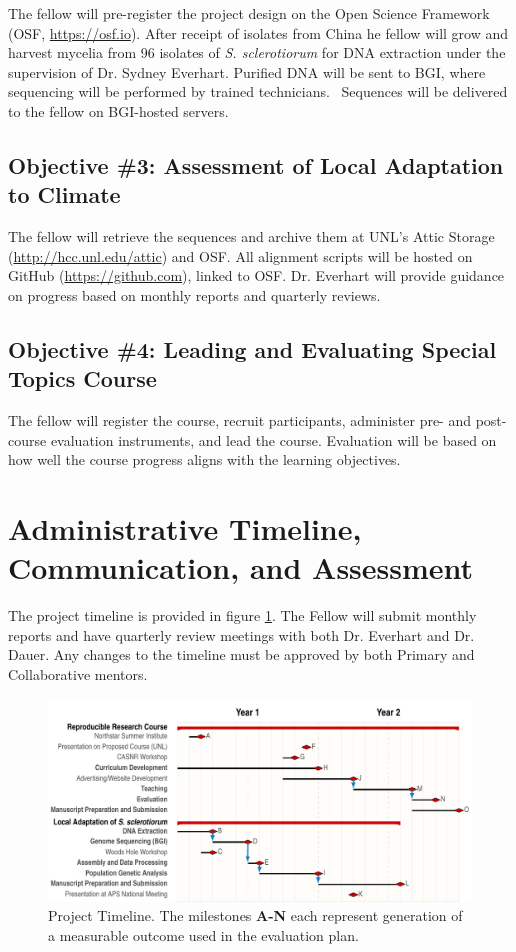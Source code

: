 \documentclass[12pt,letterpaper]{article}
\begin{document}
The fellow will pre-register the project design on the Open Science Framework (OSF, \url{https://osf.io}).
After receipt of isolates from China he fellow will grow and harvest mycelia from 96 isolates of \textit{S. sclerotiorum} for DNA extraction under the supervision of Dr. Sydney Everhart. 
Purified DNA will be sent to BGI, where sequencing will be performed by trained technicians. \
Sequences will be delivered to the fellow on BGI-hosted servers.

\subsection{Objective \#3: Assessment of Local Adaptation to Climate}

The fellow will retrieve the sequences and archive them at UNL's Attic Storage (\url{http://hcc.unl.edu/attic}) and OSF. 
All alignment scripts will be hosted on GitHub (\url{https://github.com}), linked to OSF. Dr. 
Everhart will provide guidance on progress based on monthly reports and quarterly reviews.

\subsection{Objective \#4: Leading and Evaluating Special Topics Course}

The fellow will register the course, recruit participants, administer pre- and post- course evaluation instruments, and lead the course. 
Evaluation will be based on how well the course progress aligns with the learning objectives. 

\section{Administrative Timeline, Communication, and Assessment}

The project timeline is provided in figure \ref{fig:timeline}. 
The Fellow will submit monthly reports and have quarterly review meetings with both Dr. Everhart and Dr. Dauer. 
Any changes to the timeline must be approved by both Primary and Collaborative mentors. 

\begin{figure}[!htbp]
  \centering
  \includegraphics[width=\textwidth]{packet/timeline.pdf}
  \caption{Project Timeline. The milestones \textbf{A-N} each represent generation of a measurable outcome used in the evaluation plan.}
  \label{fig:timeline}
\end{figure}
\end{document}
